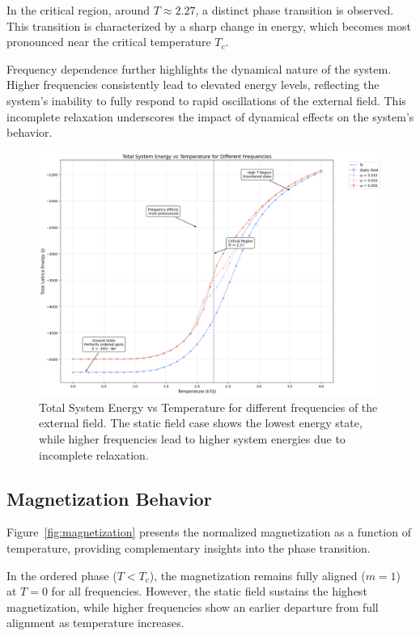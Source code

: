 \documentclass[11pt]{article}
\begin{document}
In the critical region, around $T \approx 2.27$, a distinct phase transition is observed. This transition is characterized by a sharp change in energy, which becomes most pronounced near the critical temperature $T_c$. 

Frequency dependence further highlights the dynamical nature of the system. Higher frequencies consistently lead to elevated energy levels, reflecting the system's inability to fully respond to rapid oscillations of the external field. This incomplete relaxation underscores the impact of dynamical effects on the system's behavior.

\begin{figure}[h]
\includegraphics[width=\linewidth]{plots/heating E.png}
\caption{Total System Energy vs Temperature for different frequencies of the external field. The static field case shows the lowest energy state, while higher frequencies lead to higher system energies due to incomplete relaxation.}
\label{fig:energy}
\end{figure}

\subsection{Magnetization Behavior}

Figure~\ref{fig:magnetization} presents the normalized magnetization as a function of temperature, providing complementary insights into the phase transition. 

In the ordered phase ($T < T_c$), the magnetization remains fully aligned ($m = 1$) at $T = 0$ for all frequencies. However, the static field sustains the highest magnetization, while higher frequencies show an earlier departure from full alignment as temperature increases. 
\end{document}
